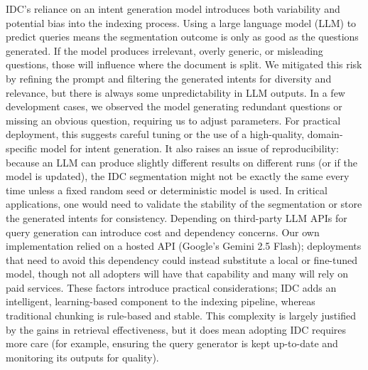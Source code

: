 \documentclass[12pt,a4paper]{report}
\begin{document}
IDC's reliance on an intent generation model introduces both variability and potential bias into the indexing process. Using a large language model (LLM) to predict queries means the segmentation outcome is only as good as the questions generated. If the model produces irrelevant, overly generic, or misleading questions, those will influence where the document is split. We mitigated this risk by refining the prompt and filtering the generated intents for diversity and relevance, but there is always some unpredictability in LLM outputs. In a few development cases, we observed the model generating redundant questions or missing an obvious question, requiring us to adjust parameters. For practical deployment, this suggests careful tuning or the use of a high-quality, domain-specific model for intent generation. It also raises an issue of reproducibility: because an LLM can produce slightly different results on different runs (or if the model is updated), the IDC segmentation might not be exactly the same every time unless a fixed random seed or deterministic model is used. In critical applications, one would need to validate the stability of the segmentation or store the generated intents for consistency. Depending on third-party LLM APIs for query generation can introduce cost and dependency concerns. Our own implementation relied on a hosted API (Google's Gemini 2.5 Flash); deployments that need to avoid this dependency could instead substitute a local or fine-tuned model, though not all adopters will have that capability and many will rely on paid services. These factors introduce practical considerations; IDC adds an intelligent, learning-based component to the indexing pipeline, whereas traditional chunking is rule-based and stable. This complexity is largely justified by the gains in retrieval effectiveness, but it does mean adopting IDC requires more care (for example, ensuring the query generator is kept up-to-date and monitoring its outputs for quality).
\end{document}
